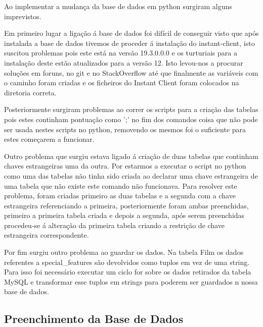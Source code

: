 \par Ao implementar a mudança da base de dados em python surgiram alguns imprevistos.
\par Em primeiro lugar a ligação á base de dados foi difícil de conseguir visto que após instalada a base de dados tivemos de proceder á instalação do instant-client, isto suscitou problemas pois este está na versão 19.3.0.0.0 e os turturiais para a instalação deste estão atualizados para a versão 12. Isto levou-nos a procurar soluções em foruns, no git e no StackOverflow até que finalmente as variáveis com o caminho foram criadas e os ficheiros do Instant Client foram colocados na diretoria correta.\newline
\par Posteriormente surgiram problemas ao correr os scripts para a criação das tabelas pois estes continham pontuação como ';' no fim dos comandos coisa que não pode ser usada nestes scripts no python, removendo os mesmos foi o suficiente para estes começarem a funcionar.\newline
\par Outro problema que surgiu estava ligado á criação de duas tabelas que continham chaves estrangeiras uma da outra. Por estarmos a executar o script no python como uma das tabelas não tinha sido criada ao declarar uma chave estrangeira de uma tabela que não existe este comando não funcionava. Para resolver este problema, foram criadas primeiro as duas tabelas e a segunda com a chave estrangeira referenciando a primeira, posteriormente foram ambas preenchidas, primeiro a primeira tabela criada e depois a segunda, após serem preenchidas procedeu-se á alteração da primeira tabela criando a restrição de chave estrangeira correspondente.\newline
\par Por fim surgiu outro problema ao guardar os dados. Na tabela Film os dados referentes a special\_features são devolvidos como tuplos em vez de uma string. Para isso foi necessário executar um ciclo for sobre os dados retirados da tabela MySQL e transformar esse tuplos em strings para poderem ser guardados n nossa base de dados.\newline  


\subsection{Preenchimento da Base de Dados}

